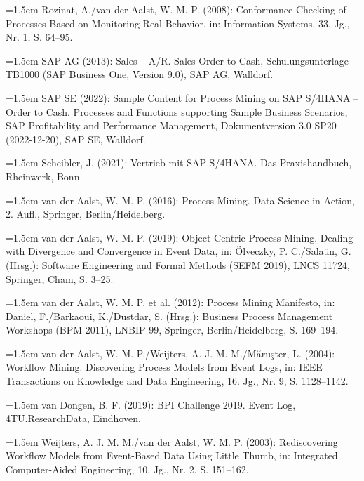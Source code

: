 \noindent\hangindent=1.5em Rozinat, A./van der Aalst, W. M. P. (2008): Conformance Checking of Processes Based on Monitoring Real Behavior, in: Information Systems, 33. Jg., Nr. 1, S. 64--95.\par

\noindent\hangindent=1.5em SAP AG (2013): Sales -- A/R. Sales Order to Cash, Schulungsunterlage TB1000 (SAP Business One, Version 9.0), SAP AG, Walldorf.\par

\noindent\hangindent=1.5em SAP SE (2022): Sample Content for Process Mining on SAP S/4HANA -- Order to Cash. Processes and Functions supporting Sample Business Scenarios, SAP Profitability and Performance Management, Dokumentversion 3.0 SP20 (2022-12-20), SAP SE, Walldorf.\par

\noindent\hangindent=1.5em Scheibler, J. (2021): Vertrieb mit SAP S/4HANA. Das Praxishandbuch, Rheinwerk, Bonn.\par

\noindent\hangindent=1.5em van der Aalst, W. M. P. (2016): Process Mining. Data Science in Action, 2. Aufl., Springer, Berlin/Heidelberg.\par

\noindent\hangindent=1.5em van der Aalst, W. M. P. (2019): Object-Centric Process Mining. Dealing with Divergence and Convergence in Event Data, in: Ölveczky, P. C./Salaün, G. (Hrsg.): Software Engineering and Formal Methods (SEFM 2019), LNCS 11724, Springer, Cham, S. 3--25.\par

\noindent\hangindent=1.5em van der Aalst, W. M. P. et al. (2012): Process Mining Manifesto, in: Daniel, F./Barkaoui, K./Dustdar, S. (Hrsg.): Business Process Management Workshops (BPM 2011), LNBIP 99, Springer, Berlin/Heidelberg, S. 169--194.\par

\noindent\hangindent=1.5em van der Aalst, W. M. P./Weijters, A. J. M. M./Măruşter, L. (2004): Workflow Mining. Discovering Process Models from Event Logs, in: IEEE Transactions on Knowledge and Data Engineering, 16. Jg., Nr. 9, S. 1128--1142.\par

\noindent\hangindent=1.5em van Dongen, B. F. (2019): BPI Challenge 2019. Event Log, 4TU.ResearchData, Eindhoven.\par

\noindent\hangindent=1.5em Weijters, A. J. M. M./van der Aalst, W. M. P. (2003): Rediscovering Workflow Models from Event-Based Data Using Little Thumb, in: Integrated Computer-Aided Engineering, 10. Jg., Nr. 2, S. 151--162.\par



\endgroup
